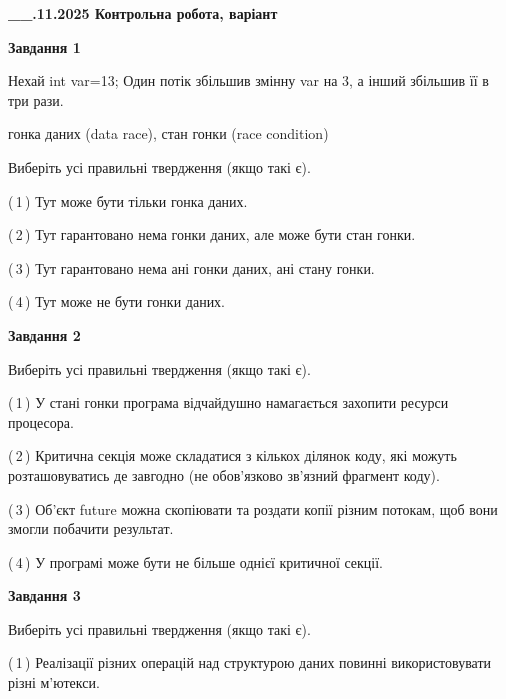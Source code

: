 \documentclass[12pt, ukrainian]{article}
\begin{document}
\begin {large}

\textbf{\_\_.11.2025 Контрольна робота, варіант  }\par


{

\begin{center}
\textbf{Завдання 1}
\end{center}
Нехай int var=13; Один потік збільшив змінну var на 3, а інший збільшив її в три рази.

гонка даних (data race), стан гонки (race condition)

Виберіть усі правильні твердження (якщо такі є).\par
\vspace{2mm}
(\,1\,) Тут може бути тільки гонка даних.%

(\,2\,) Тут гарантовано нема гонки даних, але може бути стан гонки.%

(\,3\,) Тут гарантовано нема ані гонки даних, ані стану гонки.%

(\,4\,) Тут може не бути гонки даних.%



\begin{center}
\textbf{Завдання 2}
\end{center}
Виберіть усі правильні твердження (якщо такі є).\par
\vspace{2mm}

(\,1\,) У стані гонки програма відчайдушно намагається захопити ресурси процесора.%

(\,2\,) Критична секція може складатися з кількох ділянок коду, які можуть розташовуватись де завгодно (не обов’язково зв’язний фрагмент коду).%

(\,3\,) Об’єкт future можна скопіювати та роздати копії різним потокам, щоб вони змогли побачити результат.%

(\,4\,) У програмі може бути не більше однієї критичної секції.%



\begin{center}
\textbf{Завдання 3}
\end{center}
Виберіть усі правильні твердження (якщо такі є).\par
\vspace{2mm}

(\,1\,) Реалізації різних операцій над структурою даних повинні використовувати різні м’ютекси.%

}
\end{large}
\end{document}
